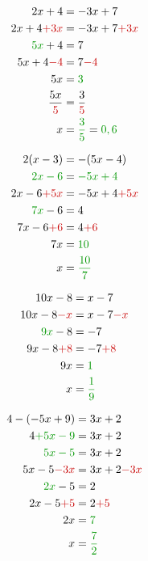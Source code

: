 \begin{pagesolutions}
    \begin{tcolorbox}[cartesolution={1}]
        \begin{align*}
            2x + 4 &= -3x + 7 \\
            2x + 4 \modif{+ 3x} &= -3x + 7 \modif{+ 3x} \\
            \reduc{5x} + 4 &= 7 \\
            5x + 4 \modif{- 4} &= 7 \modif{- 4} \\
            5x &= \reduc{3} \\
            \frac{5x}{\modif{5}} &= \frac{3}{\modif{5}} \\
            x &= \reduc{\frac{3}{5}} = \reduc{0,6}
        \end{align*}
    \end{tcolorbox}
    \begin{tcolorbox}[cartesolution={2}]
        \begin{align*}
            2(x - 3) &= -(5x - 4) \\
            \reduc{2x - 6} &= \reduc{-5x + 4} \\
            2x - 6 \modif{+ 5x} &= -5x + 4 \modif{+ 5x} \\
            \reduc{7x} - 6 &= 4 \\
            7x - 6 \modif{+ 6} &= 4 \modif{+ 6} \\
            7x &= \reduc{10} \\
            x &= \reduc{\frac{10}{7}}
        \end{align*}
    \end{tcolorbox}
    \begin{tcolorbox}[cartesolution={3}]
        \begin{align*}
            10x - 8 &= x - 7 \\
            10x - 8 \modif{- x} &= x - 7 \modif{- x} \\
            \reduc{9x} - 8 &= -7 \\
            9x - 8 \modif{+ 8} &= -7 \modif{+ 8} \\
            9x &= \reduc{1} \\
            x &= \reduc{\frac{1}{9}}
        \end{align*}
    \end{tcolorbox}
    \begin{tcolorbox}[cartesolution={4}]
        \begin{align*}
            4 - (-5x + 9) &= 3x + 2 \\
            4 \reduc{+ 5x - 9} &= 3x + 2 \\
            \reduc{5x - 5} &= 3x + 2 \\
            5x - 5 \modif{- 3x} &= 3x + 2 \modif{- 3x} \\
            \reduc{2x} - 5 &= 2 \\
            2x - 5 \modif{+ 5} &= 2 \modif{+ 5} \\
            2x &= \reduc{7} \\
            x &= \reduc{\frac{7}{2}}
        \end{align*}
    \end{tcolorbox}
\end{pagesolutions}
